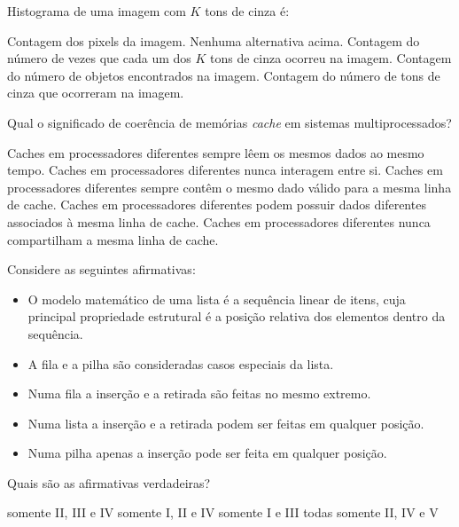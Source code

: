 \documentclass[12pt, addpoints]{exam}
\begin{document}
\begin{questions}
\question

Histograma de uma imagem com \( K \) tons de cinza é:
\begin{choices}
\choice Contagem dos pixels da imagem.
\choice Nenhuma alternativa acima.
\choice Contagem do número de vezes que cada um dos \( K \) tons de cinza ocorreu na imagem.
\choice Contagem do número de objetos encontrados na imagem.
\choice Contagem do número de tons de cinza que ocorreram na imagem.
\end{choices}

\question

Qual o significado de coerência de memórias \textit{cache} em sistemas multiprocessados?


\begin{choices}
\choice Caches em processadores diferentes sempre lêem os mesmos dados ao mesmo tempo.
\choice Caches em processadores diferentes nunca interagem entre si.
\choice Caches em processadores diferentes sempre contêm o mesmo dado válido para a mesma linha de cache.
\choice Caches em processadores diferentes podem possuir dados diferentes associados à mesma linha de cache.
\choice Caches em processadores diferentes nunca compartilham a mesma linha de cache.
\end{choices}

\question

Considere as seguintes afirmativas:

\begin{itemize}

    \item O modelo matemático de uma lista é a sequência linear de itens, cuja principal propriedade estrutural é a posição relativa dos elementos dentro da sequência.

    \item A fila e a pilha são consideradas casos especiais da lista.

    \item Numa fila a inserção e a retirada são feitas no mesmo extremo.

    \item Numa lista a inserção e a retirada podem ser feitas em qualquer posição.

    \item Numa pilha apenas a inserção pode ser feita em qualquer posição.

\end{itemize}



Quais são as afirmativas verdadeiras?
\begin{choices}
\choice somente II, III e IV
\choice somente I, II e IV
\choice somente I e III
\choice todas
\choice somente II, IV e V
\end{choices}


\end{questions}
\end{document}
